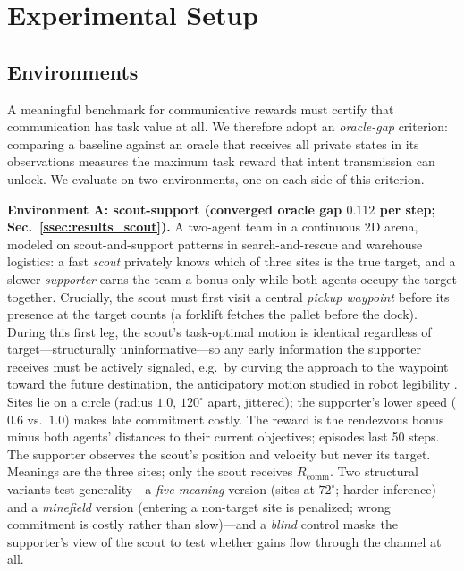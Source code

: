 \documentclass{article}
\newcommand{\Rcomm}{R_{\text{comm}}}
\begin{document}
\section{Experimental Setup}
\label{sec:methodology}

\subsection{Environments}
\label{ssec:environments}

A meaningful benchmark for communicative rewards must certify that communication has task value at all. We therefore adopt an \emph{oracle-gap} criterion: comparing a baseline against an oracle that receives all private states in its observations measures the maximum task reward that intent transmission can unlock. We evaluate on two environments, one on each side of this criterion.

\textbf{Environment A: scout-support (converged oracle gap $0.112$ per step; Sec.~\ref{ssec:results_scout}).} A two-agent team in a continuous 2D arena, modeled on scout-and-support patterns in search-and-rescue and warehouse logistics: a fast \emph{scout} privately knows which of three sites is the true target, and a slower \emph{supporter} earns the team a bonus only while both agents occupy the target together. Crucially, the scout must first visit a central \emph{pickup waypoint} before its presence at the target counts (a forklift fetches the pallet before the dock). During this first leg, the scout's task-optimal motion is identical regardless of target---structurally uninformative---so any early information the supporter receives must be actively signaled, e.g.\ by curving the approach to the waypoint toward the future destination, the anticipatory motion studied in robot legibility \cite{dragan2013legibility}. Sites lie on a circle (radius $1.0$, $120^\circ$ apart, jittered); the supporter's lower speed ($0.6$ vs.\ $1.0$) makes late commitment costly. The reward is the rendezvous bonus minus both agents' distances to their current objectives; episodes last 50 steps. The supporter observes the scout's position and velocity but never its target. Meanings are the three sites; only the scout receives $\Rcomm$. Two structural variants test generality---a \emph{five-meaning} version (sites at $72^\circ$; harder inference) and a \emph{minefield} version (entering a non-target site is penalized; wrong commitment is costly rather than slow)---and a \emph{blind} control masks the supporter's view of the scout to test whether gains flow through the channel at all.
\end{document}
